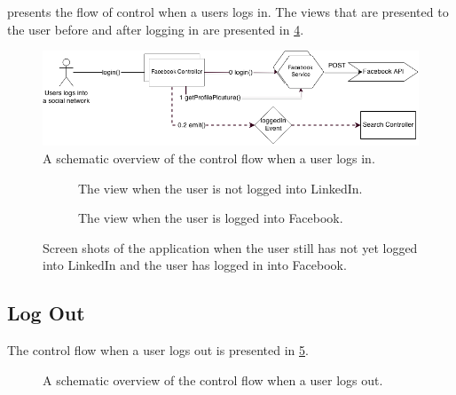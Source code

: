 		 presents the flow of control when a users logs in. The views that are presented to the user before and after logging in are presented in \cref{fig:1:viewLogIn}.


		\begin{figure}
			\includegraphics[width=\textwidth]{./img/1_login_flow}
			\caption{A schematic overview of the control flow when a user logs in.}
			\label{fig:1:controlflowLogIn}
		\end{figure}

		\begin{figure}
			\begin{subfigure}{\textwidth}
				\caption{The view when the user is not logged into LinkedIn.}
				\label{fig:1:viewLogIn:linkedin}
			\end{subfigure}
			\begin{subfigure}{\textwidth}
				\caption{The view when the user is logged into Facebook.}
				\label{fig:1:viewLogIn:facebook}
			\end{subfigure}		
			
			\caption{Screen shots of the application when  the user still has not yet logged into LinkedIn and  the user has logged in into Facebook.}
			\label{fig:1:viewLogIn}
		\end{figure}	

	\subsection{Log Out}	
			The control flow when a user logs out is presented in \cref{fig:1:controlflowLogOut}. 

			\begin{figure}
				\caption{A schematic overview of the control flow when a user logs out.}
				\label{fig:1:controlflowLogOut}
			\end{figure}		

